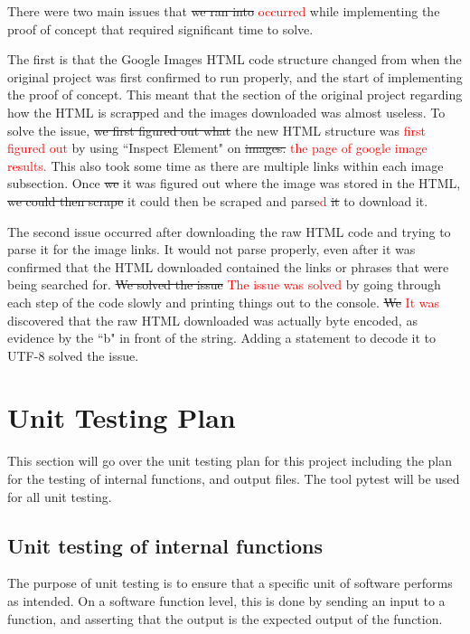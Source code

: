 \documentclass[12pt, titlepage]{article}
\begin{document}
There were two main issues that \sout{we ran into} \textcolor{red}{occurred} while implementing the proof of concept 
that required significant time to solve.

The first is that the Google Images HTML code structure changed from when the original project was first confirmed 
to run properly, and the start of implementing the proof of concept. This meant that the section of the original 
project regarding how the HTML is scra\sout{p}ped and the images downloaded was almost useless. To solve the issue, 
\sout{we first figured out what} the new HTML structure was \textcolor{red}{first figured out} by using 
``Inspect Element" on \sout{images.} \textcolor{red}{the page of google image results.} This also took some time as 
there are multiple links within each image subsection. Once \sout{we} it was figured out where the image was 
stored in the HTML, \sout{we could then scrape} it could then be scraped and parse\textcolor{red}{d} \sout{it} to download it.

The second issue occurred after downloading the raw HTML code and trying to parse it for the image links. 
It would not parse properly, even after it was confirmed that the HTML downloaded contained the links or phrases 
that were being searched for. \sout{We solved the issue} \textcolor{red}{The issue was solved} by going through 
each step of the code slowly and printing things out to the console. \sout{We} \textcolor{red}{It was} discovered that 
the raw HTML downloaded was actually byte encoded, as evidence by the ``b" in front of the string. 
Adding a statement to decode it to UTF-8 solved the issue.
	
\section{Unit Testing Plan}
\label{Unit Testing Plan}

This section will go over the unit testing plan for this project including the plan for the testing of internal functions, and output files. The tool pytest will be used for all unit testing.
		
\subsection{Unit testing of internal functions}

The purpose of unit testing is to ensure that a specific unit of software performs as intended. On a software function level, this is done by sending an input to a function, and asserting that the output is the expected output of the function.
\end{document}
